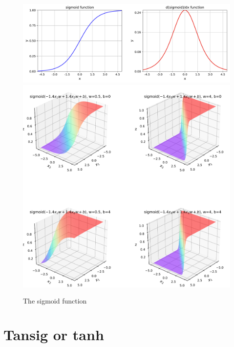 \begin{figure}[p]
\centering
\includegraphics[width=\textwidth]{pic/sigmoid01}
\includegraphics[width=\textwidth]{pic/sigmoid02}
\caption{The sigmoid function \label{fig:sigmoid}}
\end{figure}


\section{Tansig or tanh}

